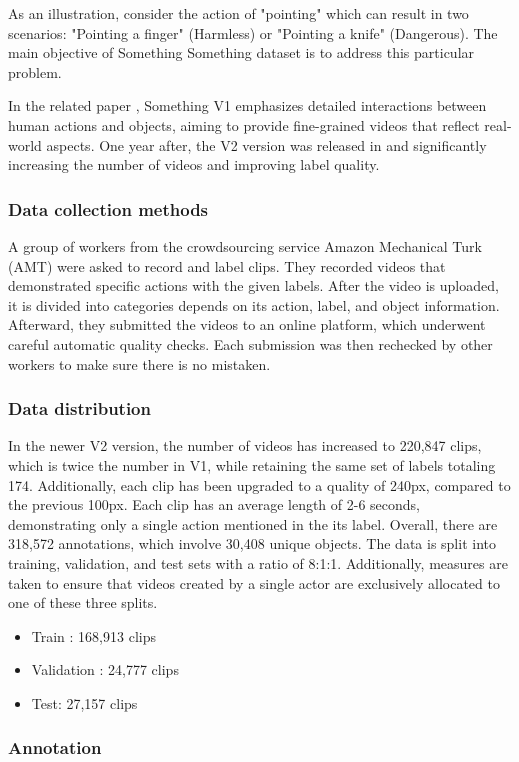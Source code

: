 \documentclass[10pt,onecolumn,letterpaper]{article}
\begin{document}
As an illustration, consider the action of "pointing" which can result in two scenarios: "Pointing a finger" (Harmless) or "Pointing a knife" (Dangerous). The main objective of Something Something dataset is to address this particular problem.

In the related paper \cite{somethingsomething}, Something V1 emphasizes detailed interactions between human actions and objects, aiming to provide fine-grained videos that reflect real-world aspects. One year after, the V2 version was released in \cite{Somethingv2} and significantly increasing the number of videos and improving label quality.
\subsubsection{Data collection methods}
A group of workers from the crowdsourcing service Amazon Mechanical Turk (AMT) were asked to record and label clips. They recorded videos that demonstrated specific actions with the given labels. After the video is uploaded, it is divided into categories depends on its action, label, and object information. Afterward, they submitted the videos to an online platform, which underwent careful automatic quality checks. Each submission was then rechecked by other workers to make sure there is no mistaken.
\subsubsection{Data distribution}
In the newer V2 version, the number of videos has increased to 220,847 clips, which is twice the number in V1, while retaining the same set of labels totaling 174. Additionally, each clip has been upgraded to a quality of 240px, compared to the previous 100px. Each clip has an average length of 2-6 seconds, demonstrating only a single action mentioned in the its label. Overall, there are 318,572 annotations, which involve 30,408 unique objects. The data is split into training, validation, and test sets with a ratio of 8:1:1. Additionally, measures are taken to ensure that videos created by a single actor are exclusively allocated to one of these three splits. 
\begin{itemize}
	\item Train : 168,913 clips
	\item Validation : 24,777 clips
	\item Test: 27,157 clips
\end{itemize}

\subsubsection{Annotation}
\end{document}

